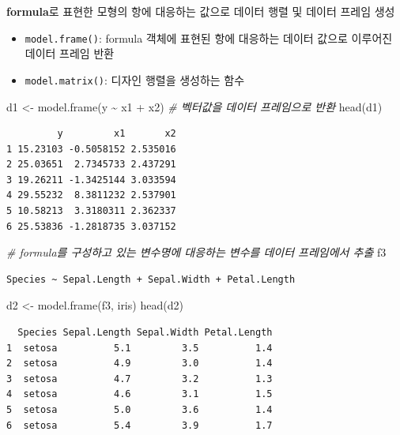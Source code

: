 \documentclass[
  11pt,
]{krantz}
\newenvironment{Shaded}{\begin{snugshade}}{\end{snugshade}}
\newcommand{\CommentTok}[1]{\textcolor[rgb]{0.37,0.37,0.37}{\textit{#1}}}
\newcommand{\FunctionTok}[1]{\textcolor[rgb]{0,0,0}{#1}}
\newcommand{\NormalTok}[1]{#1}
\newcommand{\OtherTok}[1]{\textcolor[rgb]{0.37,0.37,0.37}{#1}}
\newcommand{\SpecialCharTok}[1]{\textcolor[rgb]{0,0,0}{#1}}
\providecommand{\tightlist}{%
  \setlength{\itemsep}{0pt}\setlength{\parskip}{0pt}}
\begin{document}
\normalsize

\textbf{formula}로 표현한 모형의 항에 대응하는 값으로 데이터 행렬 및 데이터 프레임 생성

\begin{itemize}
\tightlist
\item
  \texttt{model.frame()}: formula 객체에 표현된 항에 대응하는 데이터 값으로 이루어진 데이터 프레임 반환
\item
  \texttt{model.matrix()}: 디자인 행렬을 생성하는 함수
\end{itemize}

\footnotesize

\begin{Shaded}
\begin{Highlighting}[]
\NormalTok{d1 }\OtherTok{\textless{}{-}} \FunctionTok{model.frame}\NormalTok{(y }\SpecialCharTok{\textasciitilde{}}\NormalTok{ x1 }\SpecialCharTok{+}\NormalTok{ x2) }\CommentTok{\# 벡터값을 데이터 프레임으로 반환}
\FunctionTok{head}\NormalTok{(d1)}
\end{Highlighting}
\end{Shaded}

\begin{verbatim}
         y         x1       x2
1 15.23103 -0.5058152 2.535016
2 25.03651  2.7345733 2.437291
3 19.26211 -1.3425144 3.033594
4 29.55232  8.3811232 2.537901
5 10.58213  3.3180311 2.362337
6 25.53836 -1.2818735 3.037152
\end{verbatim}

\begin{Shaded}
\begin{Highlighting}[]
\CommentTok{\# formula를 구성하고 있는 변수명에 대응하는 변수를 데이터 프레임에서 추출}
\NormalTok{f3}
\end{Highlighting}
\end{Shaded}

\begin{verbatim}
Species ~ Sepal.Length + Sepal.Width + Petal.Length
\end{verbatim}

\begin{Shaded}
\begin{Highlighting}[]
\NormalTok{d2 }\OtherTok{\textless{}{-}} \FunctionTok{model.frame}\NormalTok{(f3, iris) }
\FunctionTok{head}\NormalTok{(d2)}
\end{Highlighting}
\end{Shaded}

\begin{verbatim}
  Species Sepal.Length Sepal.Width Petal.Length
1  setosa          5.1         3.5          1.4
2  setosa          4.9         3.0          1.4
3  setosa          4.7         3.2          1.3
4  setosa          4.6         3.1          1.5
5  setosa          5.0         3.6          1.4
6  setosa          5.4         3.9          1.7
\end{verbatim}
\end{document}

